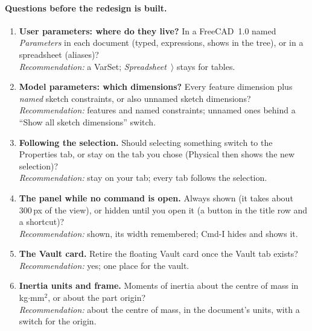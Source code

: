 \paragraph{Questions before the redesign is built.}
\begin{enumerate}
  \item \textbf{User parameters: where do they live?} In a FreeCAD~1.0  named \emph{Parameters} in
        each document (typed, expressions, shows in the tree), or in a spreadsheet (aliases)?\\
        \emph{Recommendation:} a VarSet; \emph{Spreadsheet~$\rangle$} stays for tables.
  \item \textbf{Model parameters: which dimensions?} Every feature dimension plus \emph{named} sketch constraints, or
        also unnamed sketch dimensions?\\
        \emph{Recommendation:} features and named constraints; unnamed ones behind a ``Show all sketch dimensions''
        switch.
  \item \textbf{Following the selection.} Should selecting something switch to the Properties tab, or stay on the
        tab you chose (Physical then shows the new selection)?\\
        \emph{Recommendation:} stay on your tab; every tab follows the selection.
  \item \textbf{The panel while no command is open.} Always shown (it takes about 300\,px of the view), or hidden
        until you open it (a button in the title row and a shortcut)?\\
        \emph{Recommendation:} shown, its width remembered; Cmd-I hides and shows it.
  \item \textbf{The Vault card.} Retire the floating Vault card once the Vault tab exists?\\
        \emph{Recommendation:} yes; one place for the vault.
  \item \textbf{Inertia units and frame.} Moments of inertia about the centre of mass in kg$\cdot$mm$^2$, or about the
        part origin?\\
        \emph{Recommendation:} about the centre of mass, in the document's units, with a switch for the origin.
\end{enumerate}
